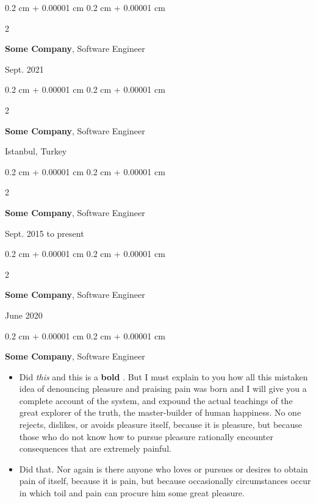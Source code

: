 \documentclass[10pt, letterpaper]{article}
\newenvironment{highlights}{
    \begin{itemize}[
        topsep=0.10 cm,
        parsep=0.10 cm,
        partopsep=0pt,
        itemsep=0pt,
        leftmargin=0.4 cm + 10pt
    ]
}{
    \end{itemize}
} %
\newenvironment{onecolentry}{
    \begin{adjustwidth}{
        0.2 cm + 0.00001 cm
    }{
        0.2 cm + 0.00001 cm
    }
}{
    \end{adjustwidth}
} %
\newenvironment{twocolentry}[2][]{
    \onecolentry
    \def\secondColumn{#2}
    \setcolumnwidth{\fill, 4.5 cm}
    \begin{paracol}{2}
}{
    \switchcolumn \raggedleft \secondColumn
    \end{paracol}
    \endonecolentry
} %
\let\hrefWithoutArrow\href
\renewcommand{\href}[2]{\hrefWithoutArrow{#1}{\mbox{\ifthenelse{\equal{#2}{}}{ }{#2 }\raisebox{.15ex}{\footnotesize \faExternalLink*}}}}
\begin{document}
        \vspace{0.2 cm}

        \begin{twocolentry}{
            Sept. 2021
        }
            \textbf{Some \textnormal{Company}}, Software Engineer
        \end{twocolentry}


        \vspace{0.2 cm}

        \begin{twocolentry}{
            Istanbul, Turkey
        }
            \textbf{Some \textnormal{Company}}, Software Engineer
        \end{twocolentry}


        \vspace{0.2 cm}

        \begin{twocolentry}{
            Sept. 2015 to present
        }
            \textbf{Some \textnormal{Company}}, Software Engineer
        \end{twocolentry}


        \vspace{0.2 cm}

        \begin{twocolentry}{
            June 2020
        }
            \textbf{Some \textnormal{Company}}, Software Engineer
        \end{twocolentry}


        \vspace{0.2 cm}

        \begin{onecolentry}
            \textbf{Some \textnormal{Company}}, Software Engineer
            \begin{highlights}
                \item Did \textit{this} and this is a \textbf{bold} \href{https://example.com}{link}. But I must explain to you how all this mistaken idea of denouncing pleasure and praising pain was born and I will give you a complete account of the system, and expound the actual teachings of the great explorer of the truth, the master-builder of human happiness. No one rejects, dislikes, or avoids pleasure itself, because it is pleasure, but because those who do not know how to pursue pleasure rationally encounter consequences that are extremely painful.
                \item Did that. Nor again is there anyone who loves or pursues or desires to obtain pain of itself, because it is pain, but because occasionally circumstances occur in which toil and pain can procure him some great pleasure.
            \end{highlights}
        \end{onecolentry}
\end{document}
